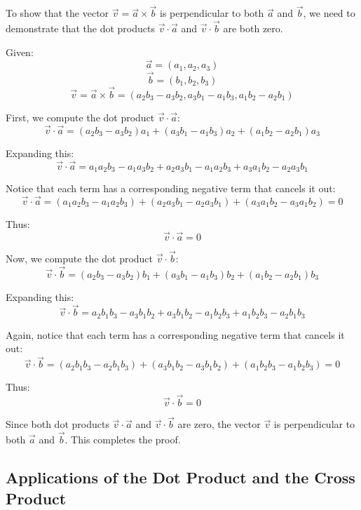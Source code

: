 \documentclass{article}
\begin{document}
To show that the vector $\vec{v} = \vec{a} \times \vec{b}$ is perpendicular to both $\vec{a}$ and $\vec{b}$, we need to demonstrate that the dot products $\vec{v} \cdot \vec{a}$ and $\vec{v} \cdot \vec{b}$ are both zero.

Given:
\[
\vec{a} = (a_1, a_2, a_3)
\]
\[
\vec{b} = (b_1, b_2, b_3)
\]
\[
\vec{v} = \vec{a} \times \vec{b} = (a_2 b_3 - a_3 b_2, a_3 b_1 - a_1 b_3, a_1 b_2 - a_2 b_1)
\]

First, we compute the dot product $\vec{v} \cdot \vec{a}$:
\[
\vec{v} \cdot \vec{a} = (a_2 b_3 - a_3 b_2) a_1 + (a_3 b_1 - a_1 b_3) a_2 + (a_1 b_2 - a_2 b_1) a_3
\]

Expanding this:
\[
\vec{v} \cdot \vec{a} = a_1 a_2 b_3 - a_1 a_3 b_2 + a_2 a_3 b_1 - a_1 a_2 b_3 + a_3 a_1 b_2 - a_2 a_3 b_1
\]

Notice that each term has a corresponding negative term that cancels it out:
\[
\vec{v} \cdot \vec{a} = (a_1 a_2 b_3 - a_1 a_2 b_3) + (a_2 a_3 b_1 - a_2 a_3 b_1) + (a_3 a_1 b_2 - a_3 a_1 b_2) = 0
\]

Thus:
\[
\vec{v} \cdot \vec{a} = 0
\]

Now, we compute the dot product $\vec{v} \cdot \vec{b}$:
\[
\vec{v} \cdot \vec{b} = (a_2 b_3 - a_3 b_2) b_1 + (a_3 b_1 - a_1 b_3) b_2 + (a_1 b_2 - a_2 b_1) b_3
\]

Expanding this:
\[
\vec{v} \cdot \vec{b} = a_2 b_1 b_3 - a_3 b_1 b_2 + a_3 b_1 b_2 - a_1 b_2 b_3 + a_1 b_2 b_3 - a_2 b_1 b_3
\]

Again, notice that each term has a corresponding negative term that cancels it out:
\[
\vec{v} \cdot \vec{b} = (a_2 b_1 b_3 - a_2 b_1 b_3) + (a_3 b_1 b_2 - a_3 b_1 b_2) + (a_1 b_2 b_3 - a_1 b_2 b_3) = 0
\]

Thus:
\[
\vec{v} \cdot \vec{b} = 0
\]

Since both dot products $\vec{v} \cdot \vec{a}$ and $\vec{v} \cdot \vec{b}$ are zero, the vector $\vec{v}$ is perpendicular to both $\vec{a}$ and $\vec{b}$. This completes the proof.
\newpage 



\subsection{Applications of the Dot Product and the Cross Product } 
\end{document}
